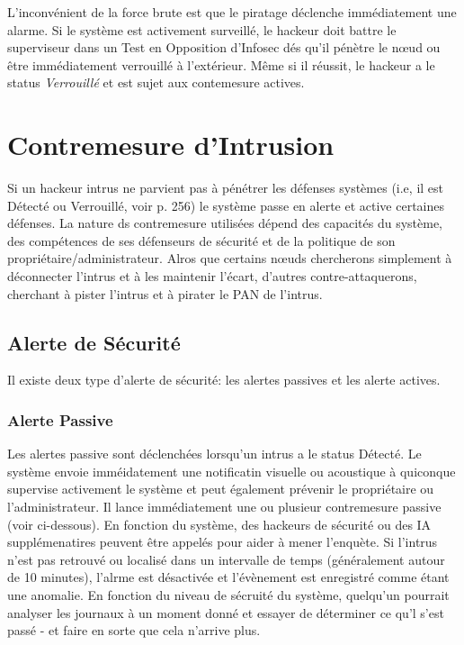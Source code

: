 L'inconvénient de la force brute est que le piratage déclenche immédiatement une alarme. Si le système est activement surveillé, le hackeur doit battre le superviseur dans un Test en Opposition d'Infosec dés qu'il pénètre le nœud ou être immédiatement verrouillé à l'extérieur. Même si il réussit, le hackeur a le status \textit{Verrouillé} et est sujet aux contemesure actives. 



\section{Contremesure d'Intrusion} 

Si un hackeur intrus ne parvient pas à pénétrer les défenses systèmes (i.e, il est Détecté ou Verrouillé, voir p. 256) le système passe en alerte et active certaines défenses. La nature ds contremesure utilisées dépend des capacités du système, des compétences de ses défenseurs de sécurité et de la politique de son propriétaire/administrateur. Alros que certains nœuds chercherons simplement à déconnecter l'intrus et à les maintenir  l'écart, d'autres contre-attaquerons, cherchant à pister l'intrus et à pirater le PAN de l'intrus. 

\subsection{Alerte de Sécurité} 

Il existe deux type d'alerte de sécurité: les alertes passives et les alerte actives. 

\subsubsection{Alerte Passive} 

Les alertes passive sont déclenchées lorsqu'un intrus a le status Détecté. Le système envoie imméidatement une notificatin visuelle ou acoustique à quiconque supervise activement le système et peut également prévenir le propriétaire ou l'administrateur. Il lance immédiatement une ou plusieur contremesure passive (voir ci-dessous). En fonction du système, des hackeurs de sécurité ou des IA supplémenatires peuvent être appelés pour aider à mener l'enquète. Si l'intrus n'est pas retrouvé ou localisé dans un intervalle de temps (généralement autour de 10 minutes), l'alrme est désactivée et l'évènement est enregistré comme étant une anomalie. En fonction du niveau de sécruité du système, quelqu'un pourrait analyser les journaux à un moment donné et essayer de déterminer ce qu'l s'est passé - et faire en sorte que cela n'arrive plus. 

